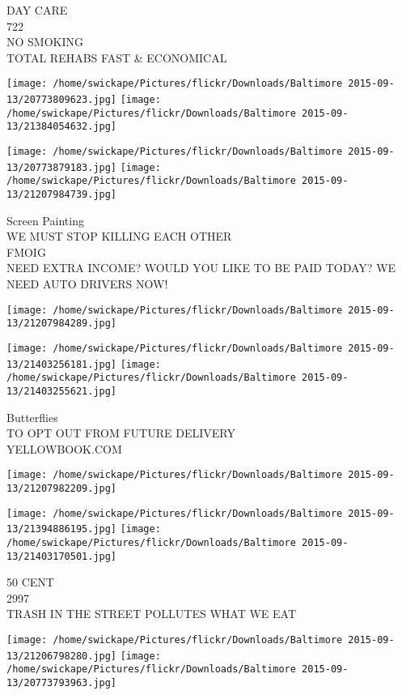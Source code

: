 \documentclass[10pt,letterpaper]{article}
\begin{document}
DAY CARE\\
722\\
NO SMOKING\\
TOTAL REHABS FAST \& ECONOMICAL
\pagebreak

\texttt{[image: /home/swickape/Pictures/flickr/Downloads/Baltimore 2015-09-13/20773809623.jpg]}
\texttt{[image: /home/swickape/Pictures/flickr/Downloads/Baltimore 2015-09-13/21384054632.jpg]}

\texttt{[image: /home/swickape/Pictures/flickr/Downloads/Baltimore 2015-09-13/20773879183.jpg]}
\texttt{[image: /home/swickape/Pictures/flickr/Downloads/Baltimore 2015-09-13/21207984739.jpg]}

Screen Painting\\
WE MUST STOP KILLING EACH OTHER\\
FMOIG\\
NEED EXTRA INCOME?  WOULD YOU LIKE TO BE PAID TODAY?  WE NEED AUTO DRIVERS NOW!
\pagebreak

\texttt{[image: /home/swickape/Pictures/flickr/Downloads/Baltimore 2015-09-13/21207984289.jpg]}

\vspace{0.25in}
\texttt{[image: /home/swickape/Pictures/flickr/Downloads/Baltimore 2015-09-13/21403256181.jpg]}
\texttt{[image: /home/swickape/Pictures/flickr/Downloads/Baltimore 2015-09-13/21403255621.jpg]}

Butterflies\\
TO OPT OUT FROM FUTURE DELIVERY\\
YELLOWBOOK.COM
\pagebreak

\texttt{[image: /home/swickape/Pictures/flickr/Downloads/Baltimore 2015-09-13/21207982209.jpg]}

\vspace{0.25in}
\texttt{[image: /home/swickape/Pictures/flickr/Downloads/Baltimore 2015-09-13/21394886195.jpg]}
\texttt{[image: /home/swickape/Pictures/flickr/Downloads/Baltimore 2015-09-13/21403170501.jpg]}

50 CENT\\
2997\\
TRASH IN THE STREET POLLUTES WHAT WE EAT
\pagebreak

\texttt{[image: /home/swickape/Pictures/flickr/Downloads/Baltimore 2015-09-13/21206798280.jpg]}
\texttt{[image: /home/swickape/Pictures/flickr/Downloads/Baltimore 2015-09-13/20773793963.jpg]}
\end{document}
